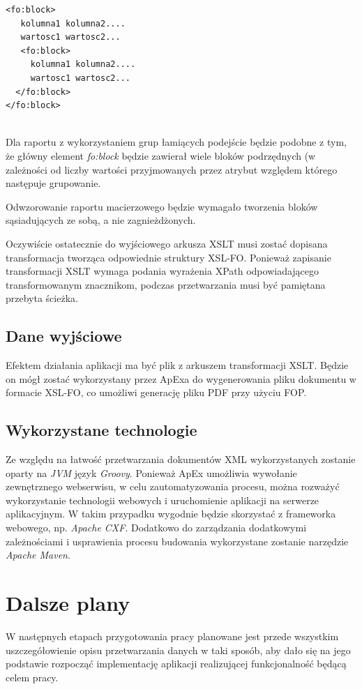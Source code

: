 \documentclass[11pt,a4paper]{article}
\begin{document}
\lstset{language=XML}
\begin{lstlisting}[frame=single,caption=Przykładowa struktura pliku XSL-FO,label=strukturaXSL]
<fo:block>
   kolumna1 kolumna2....
   wartosc1 wartosc2...
   <fo:block>
     kolumna1 kolumna2....
     wartosc1 wartosc2...	
  </fo:block>
</fo:block>


\end{lstlisting}

Dla raportu z wykorzystaniem grup łamiących podejście będzie podobne z tym, że główny element \emph{fo:block} będzie zawierał wiele bloków podrzędnych (w zależności od liczby wartości przyjmowanych przez atrybut względem którego następuje grupowanie.

Odwzorowanie raportu macierzowego będzie wymagało tworzenia bloków sąsiadujących ze sobą, a nie zagnieżdżonych.

Oczywiście ostatecznie do wyjściowego arkusza XSLT musi zostać dopisana transformacja tworząca odpowiednie struktury XSL-FO. Ponieważ zapisanie transformacji XSLT wymaga podania wyrażenia XPath odpowiadającego transformowanym znacznikom, podczas przetwarzania musi być pamiętana przebyta ścieżka.

\subsection{Dane wyjściowe}\label{sec:appOutput}
 Efektem działania aplikacji ma być plik z arkuszem transformacji XSLT. Będzie on mógł zostać wykorzystany przez ApExa do wygenerowania pliku dokumentu w formacie XSL-FO, co umożliwi generację pliku PDF przy użyciu FOP.

\subsection{Wykorzystane technologie} \label{sec:appTech}
Ze względu na łatwość przetwarzania dokumentów XML wykorzystanych zostanie oparty na \emph{JVM} język \emph{Groovy}. Ponieważ ApEx umożliwia wywołanie zewnętrznego webserwisu, w celu zautomatyzowania procesu, można rozważyć wykorzystanie technologii webowych i uruchomienie aplikacji na serwerze aplikacyjnym. W takim przypadku wygodnie będzie skorzystać z frameworka webowego, np. \emph{Apache CXF}. Dodatkowo do zarządzania dodatkowymi zależnościami i usprawienia procesu budowania wykorzystane zostanie narzędzie \emph{Apache Maven}.

\section{Dalsze plany}\label{sec:plany}
W następnych etapach przygotowania pracy planowane jest przede wszystkim uszczegółowienie opisu przetwarzania danych w taki sposób, aby dało się na jego podstawie rozpocząć implementację aplikacji realizującej funkcjonalność będącą celem pracy. 
\end{document}
